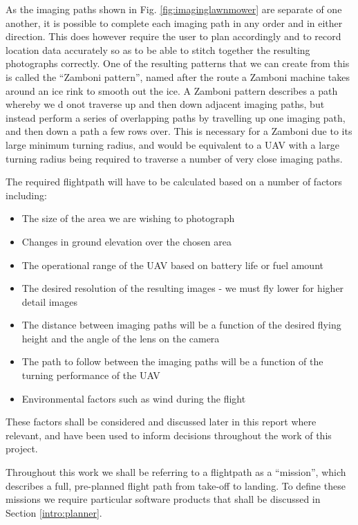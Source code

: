 As the imaging paths shown in Fig. \ref{fig:imaginglawnmower} are separate of one another, it is possible to complete each imaging path in any order and in either direction. This does however require the user to plan accordingly and to record location data accurately so as to be able to stitch together the resulting photographs correctly. One of the resulting patterns that we can create from this is called the ``Zamboni pattern'', named after the route a Zamboni machine takes around an ice rink to smooth out the ice. A Zamboni pattern describes a path whereby we d onot traverse up and then down adjacent imaging paths, but instead perform a series of overlapping paths by travelling up one imaging path, and then down a path a few rows over. This is necessary for a Zamboni due to its large minimum turning radius, and would be equivalent to a UAV with a large turning radius being required to traverse a number of very close imaging paths. 

The required flightpath will have to be calculated based on a number of factors including:
\begin{itemize}
	\item The size of the area we are wishing to photograph
	\item Changes in ground elevation over the chosen area
	\item The operational range of the UAV based on battery life or fuel amount
	\item The desired resolution of the resulting images - we must fly lower for higher detail images
	\item The distance between imaging paths will be a function of the desired flying height and the angle of the lens on the camera
	\item The path to follow between the imaging paths will be a function of the turning performance of the UAV
	\item Environmental factors such as wind during the flight
\end{itemize}

These factors shall be considered and discussed later in this report where relevant, and have been used to inform decisions throughout the work of this project.

Throughout this work we shall be referring to a flightpath as a ``mission'', which describes a full, pre-planned flight path from take-off to landing. To define these missions we require particular software products that shall be discussed in Section \ref{intro:planner}.



